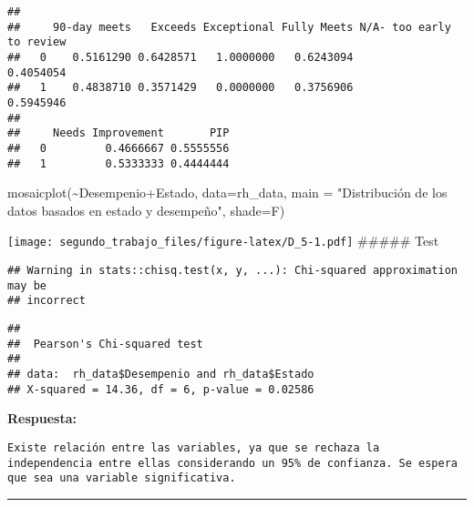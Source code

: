 \documentclass[
]{article}
\newenvironment{Shaded}{\begin{snugshade}}{\end{snugshade}}
\newcommand{\AttributeTok}[1]{\textcolor[rgb]{0.77,0.63,0.00}{#1}}
\newcommand{\FunctionTok}[1]{\textcolor[rgb]{0.00,0.00,0.00}{#1}}
\newcommand{\NormalTok}[1]{#1}
\newcommand{\SpecialCharTok}[1]{\textcolor[rgb]{0.00,0.00,0.00}{#1}}
\newcommand{\StringTok}[1]{\textcolor[rgb]{0.31,0.60,0.02}{#1}}
\begin{document}
\begin{verbatim}
##    
##     90-day meets   Exceeds Exceptional Fully Meets N/A- too early to review
##   0    0.5161290 0.6428571   1.0000000   0.6243094                0.4054054
##   1    0.4838710 0.3571429   0.0000000   0.3756906                0.5945946
##    
##     Needs Improvement       PIP
##   0         0.4666667 0.5555556
##   1         0.5333333 0.4444444
\end{verbatim}

\begin{Shaded}
\begin{Highlighting}[]
\FunctionTok{mosaicplot}\NormalTok{(}\SpecialCharTok{\textasciitilde{}}\NormalTok{Desempenio}\SpecialCharTok{+}\NormalTok{Estado, }\AttributeTok{data=}\NormalTok{rh\_data, }\AttributeTok{main =} \StringTok{"Distribución de los datos basados en estado y desempeño"}\NormalTok{, }\AttributeTok{shade=}\NormalTok{F)}
\end{Highlighting}
\end{Shaded}

\texttt{[image: segundo\_trabajo\_files/figure-latex/D\_5-1.pdf]}
\#\#\#\#\# Test

\begin{Shaded}
\end{Shaded}

\begin{verbatim}
## Warning in stats::chisq.test(x, y, ...): Chi-squared approximation may be
## incorrect
\end{verbatim}

\begin{verbatim}
## 
##  Pearson's Chi-squared test
## 
## data:  rh_data$Desempenio and rh_data$Estado
## X-squared = 14.36, df = 6, p-value = 0.02586
\end{verbatim}

\textbf{Respuesta:}

\begin{verbatim}
Existe relación entre las variables, ya que se rechaza la independencia entre ellas considerando un 95% de confianza. Se espera que sea una variable significativa.
\end{verbatim}

\begin{center}\rule{0.5\linewidth}{0.5pt}\end{center}
\end{document}
